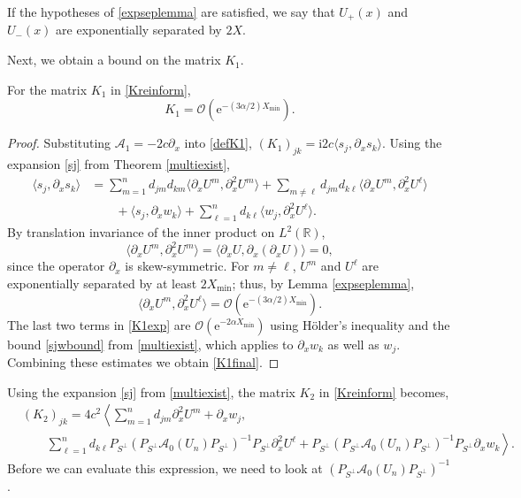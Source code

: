 \documentclass[review,onefignum,onetabnum]{siamart171218}
\newcommand{\R}{\mathbb{R}}
\newcommand{\rme}{\mathrm{e}}
\newcommand{\rmi}{\mathrm{i}}
\newcommand{\calA}{\mathcal{A}}
\newcommand{\vK}{\bm{\mathit{K}}}
\begin{document}
\begin{remark}
If the hypotheses of \cref{expseplemma} are satisfied, we say that $U_+(x)$ and $U_-(x)$ are exponentially separated by $2X$.
\end{remark}

Next, we obtain a bound on the matrix $\vK_1$.
\begin{lemma}\label{K1small}
For the matrix $\vK_1$ in \cref{Kreinform},
\begin{equation}\label{K1final}
\vK_1 = \mathcal{O}(\rme^{-(3 \alpha/2) X_{\mathrm{min}}}).
\end{equation}
\end{lemma}

\begin{proof}
Substituting $\calA_1 = -2c\partial_x$ into \cref{defK1}, $(\vK_1)_{jk} = \rmi 2 c \langle s_j, \partial_xs_k \rangle$. Using the expansion \cref{sj} from Theorem \ref{multiexist},
\begin{equation}\label{K1exp}
\begin{aligned}
\langle s_j ,\partial_xs_k \rangle
&= \sum_{m = 1}^{n} d_{jm} d_{km} \langle \partial_xU^m, \partial_x^2U^m \rangle
+ \sum_{m \neq\ell} d_{jm} d_{k\ell} \langle \partial_xU^m, \partial_x^2U^\ell \rangle\\
&\qquad
+ \langle s_j, \partial_x w_k \rangle
+ \sum_{\ell = 1}^{n} d_{k\ell} \langle w_j, \partial_x^2U^\ell \rangle.
\end{aligned}
\end{equation}
By translation invariance of the inner product on $L^2(\R)$,
\[
\langle \partial_xU^m, \partial_x^2U^m \rangle = \langle \partial_xU, \partial_x(\partial_xU) \rangle = 0,
\]
since the operator $\partial_x$ is skew-symmetric. For $m \neq\ell$, $U^m$ and $U^\ell$ are exponentially separated by at least $2 X_{\mathrm{min}}$; thus, by Lemma \ref{expseplemma},
\[
\langle \partial_xU^m, \partial_x^2U^\ell \rangle = \mathcal{O}(\rme^{-(3 \alpha/2) X_{\mathrm{min}}}).
\]
The last two terms in \cref{K1exp} are $\mathcal{O}(\rme^{-2 \alpha X_{\mathrm{min}}})$ using H\"{o}lder's inequality and the bound \cref{sjwbound} from \cref{multiexist}, which applies to $\partial_x w_k$ as well as $w_j$. Combining these estimates we obtain \cref{K1final}.
\end{proof}

Using the expansion \cref{sj} from \cref{multiexist}, the matrix $\vK_2$ in \cref{Kreinform} becomes,
\begin{equation}\label{K2expansion}
\begin{aligned}
&(\vK_2)_{jk}
= 4 c^2 \left\langle\sum_{m = 1}^{n} d_{jm} \partial_x^2U^m + \partial_x w_j,\right. \\
&\qquad\left.\sum_{\ell = 1}^{n} d_{k\ell} P_{S^\perp} (P_{S^\perp} \calA_0(U_n)P_{S^\perp})^{-1} P_{S^\perp} \partial_x^2U^\ell + P_{S^\perp} (P_{S^\perp} \calA_0(U_n)P_{S^\perp})^{-1} P_{S^\perp}\partial_xw_k \right\rangle.
\end{aligned}
\end{equation}
Before we can evaluate this expression, we need to look at $(P_{S^\perp} \calA_0(U_n)P_{S^\perp})^{-1}$.
\end{document}
